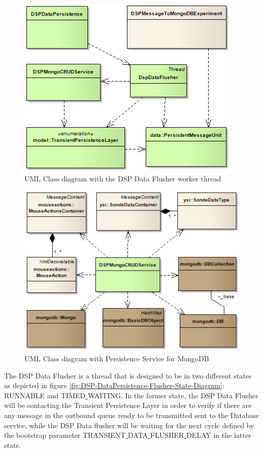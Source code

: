 \begin{figure}[!b]
  \centering
  \includegraphics[scale=0.5]{../diagrams/DSP-DataPersistence-Flusher-Classes}
  \caption{UML Class diagram with the DSP Data Flusher worker thread}
  \label{fig:DSP-DataPersistence-Flusher-Classes}
\end{figure}

\begin{figure}[!b]
  \centering
  \includegraphics[scale=0.5]{../diagrams/DSP-Data-Persistence-Mongo-Classes}
  \caption{UML Class diagram with Persistence Service for MongoDB}
  \label{fig:DSP-Data-Persistence-Mongo-Classes}
\end{figure}

The DSP Data Flusher is a thread that is designed to be in two different
states as depicted in figure
\ref{fig:DSP-DataPersistence-Flusher-State-Diagram}: RUNNABLE and
TIMED\underline{ }WAITING. In the former state, the DSP Data Flusher will be
contacting the Transient Persistence Layer in order to verify if there are any
message in the outbound queue ready to be transmitted sent to the Database
service, while the DSP Data flusher will be waiting for the next cycle defined
by the bootstrap parameter TRANSIENT\underline{ }DATA\underline{
}FLUSHER\underline{ }DELAY in the latter state.

